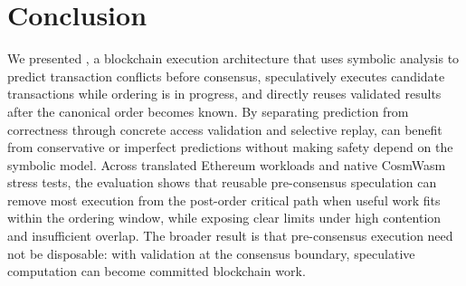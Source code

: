 \section{Conclusion}
We presented \system, a blockchain execution architecture that uses symbolic analysis to predict transaction conflicts before consensus, speculatively executes candidate transactions while ordering is in progress, and directly reuses validated results after the canonical order becomes known. By separating prediction from correctness through concrete access validation and selective replay, \system can benefit from conservative or imperfect predictions without making safety depend on the symbolic model. Across translated Ethereum workloads and native CosmWasm stress tests, the evaluation shows that reusable pre-consensus speculation can remove most execution from the post-order critical path when useful work fits within the ordering window, while exposing clear limits under high contention and insufficient overlap. The broader result is that pre-consensus execution need not be disposable: with validation at the consensus boundary, speculative computation can become committed blockchain work.
